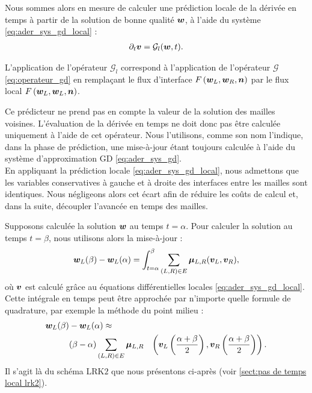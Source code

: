 Nous sommes alors en mesure de calculer une prédiction locale de la dérivée
en temps à partir de la solution de bonne qualité $\bm{w}$, à l'aide
du système \eqref{eq:ader_sys_gd_local} :
\begin{align}
	\partial_{t} \bm{v} = \mathcal{G}_l (\bm{w}, t)
	\label{eq:operateur_gd_local} .
\end{align}

\begin{remark}
	L'application de l'opérateur $\mathcal{G}_l$ correspond à l'application
	de l'opérateur $\mathcal{G}$ \eqref{eq:operateur_gd} en remplaçant
	le flux d'interface $F\left(\bm{w}_L,\bm{w}_R,\bm{n}\right)$ par le flux
	local $F\left(\bm{w}_L,\bm{w}_L,\bm{n}\right)$.
\end{remark}

\begin{remark}
	Ce prédicteur ne prend pas en compte la valeur de la solution
	des mailles voisines. L'évaluation de la dérivée en temps ne doit donc
	pas être calculée uniquement à l'aide de cet opérateur.
	Nous l'utilisons, comme son nom l'indique, dans la phase de
	prédiction, une mise-à-jour étant toujours calculée à l'aide
	du système d'approximation GD \eqref{eq:ader_sys_gd}.
	\\
	En appliquant la prédiction locale \eqref{eq:ader_sys_gd_local},
	nous admettons que les variables conservatives à gauche et à droite
	des interfaces entre les mailles sont identiques.
	Nous négligeons alors cet écart afin de réduire les coûts de calcul
	et, dans la suite, découpler l'avancée en temps des mailles.
\end{remark}



Supposons calculée la solution $\bm{w}$ au temps $t = \alpha$. Pour calculer
la solution au temps $t = \beta$, nous utilisons alors la mise-à-jour :
\begin{align}
	\bm{w}_L(\beta) - \bm{w}_L(\alpha) =
	\int_{t=\alpha}^{\beta} \sum_{(L,R) \in E}
		\bm{\mu}_{L,R} (\bm{v}_L, \bm{v}_R)
	\label{eq:methode_locale_int_t_cont} ,
\end{align}
où $\bm{v}$ est calculé grâce au équations différentielles locales \eqref{eq:ader_sys_gd_local}.
Cette intégrale en temps peut être approchée par n'importe quelle formule
de quadrature, par exemple la méthode du point milieu :
\begin{align}
	\begin{aligned}
		\bm{w}_L(\beta) &- \bm{w}_L(\alpha) \approx \\ 
		&(\beta - \alpha) \sum_{(L,R) \in E}
			\bm{\mu}_{L,R} &\left(\bm{v}_L \left(\frac{\alpha + \beta}{2}\right),
				\bm{v}_R \left(\frac{\alpha + \beta}{2}\right)\right)
		\label{eq:methode_locale_int_t_pm} .
	\end{aligned}
\end{align}
Il s'agit là du schéma LRK$2$ que nous présentons ci-après
(voir \ref{sect:pas de temps local lrk2}).

